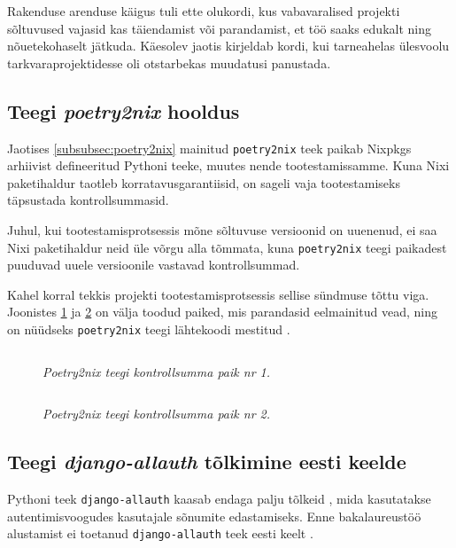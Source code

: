 Rakenduse arenduse käigus tuli ette olukordi, kus vabavaralised projekti sõltuvused vajasid kas täiendamist või parandamist, et töö saaks edukalt ning nõuetekohaselt jätkuda. Käesolev jaotis kirjeldab kordi, kui tarneahelas ülesvoolu tarkvaraprojektidesse oli otstarbekas muudatusi panustada.

\subsection{Teegi \emph{poetry2nix} hooldus}

Jaotises \ref{subsubsec:poetry2nix} mainitud \texttt{poetry2nix} teek paikab Nixpkgs arhiivist defineeritud Pythoni teeke, muutes nende tootestamissamme. Kuna Nixi paketihaldur taotleb korratavusgarantiisid, on sageli vaja tootestamiseks täpsustada kontrollsummasid.

Juhul, kui tootestamisprotsessis mõne sõltuvuse versioonid on uuenenud, ei saa Nixi paketihaldur neid üle võrgu alla tõmmata, kuna \texttt{poetry2nix} teegi paikadest puuduvad uuele versioonile vastavad kontrollsummad.

Kahel korral tekkis projekti tootestamisprotsessis sellise sündmuse tõttu viga. Joonistes \ref{fig:poetry2nix-patch1} ja \ref{fig:poetry2nix-patch2} on välja toodud paiked, mis parandasid eelmainitud vead, ning on nüüdseks \texttt{poetry2nix} teegi lähtekoodi mestitud \cite{poetry2nix-pr-1, poetry2nix-pr-2}.

\begin{figure}
\inputminted[breaklines]{diff}{chapters/data/poetry2nix-patch1.diff}
\caption{\emph{Poetry2nix teegi kontrollsumma paik nr 1.}}\label{fig:poetry2nix-patch1}
\end{figure}

\begin{figure}
\inputminted[breaklines]{diff}{chapters/data/poetry2nix-patch2.diff}
\caption{\emph{Poetry2nix teegi kontrollsumma paik nr 2.}}\label{fig:poetry2nix-patch2}
\end{figure}

\subsection{Teegi \textit{django-allauth} tõlkimine eesti keelde}

Pythoni teek \texttt{django-allauth} kaasab endaga palju tõlkeid \cite{django-allauth-i18n}, mida kasutatakse autentimisvoogudes kasutajale sõnumite edastamiseks. Enne bakalaureustöö alustamist ei toetanud \texttt{django-allauth} teek eesti keelt \cite{django-allauth-pre-et-i18n}.

